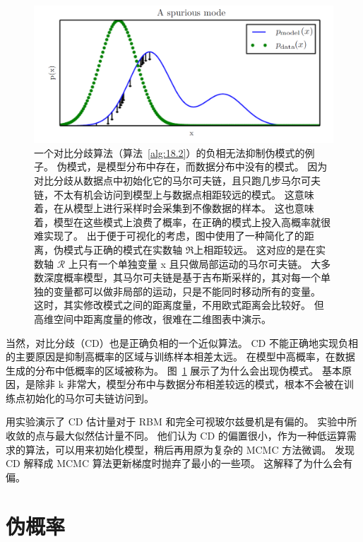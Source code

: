 \begin{figure}[htbp] %
   \centering
   \includegraphics[width=\textwidth]{fig/chap18/18_2.png} 
   \caption{一个对比分歧算法（算法~\ref{alg:18.2}）的负相无法抑制伪模式的例子。
   伪模式，是模型分布中存在，而数据分布中没有的模式。
   因为对比分歧从数据点中初始化它的马尔可夫链，且只跑几步马尔可夫链，不太有机会访问到模型上与数据点相距较远的模式。
   这意味着，在从模型上进行采样时会采集到不像数据的样本。
   这也意味着，模型在这些模式上浪费了概率，在正确的模式上投入高概率就很难实现了。
   出于便于可视化的考虑，图中使用了一种简化了的距离，伪模式与正确的模式在实数轴 \(\mathfrak{R}\)上相距较远。
   这对应的是在实数轴 \(\mathcal{R} \) 上只有一个单独变量 x 且只做局部运动的马尔可夫链。
   大多数深度概率模型，其马尔可夫链是基于吉布斯采样的，其对每一个单独的变量都可以做非局部的运动，只是不能同时移动所有的变量。
   这时，其实修改模式之间的距离度量，不用欧式距离会比较好。
   但高维空间中距离度量的修改，很难在二维图表中演示。}
   \label{fig:18.2}
\end{figure}

当然，对比分歧（CD）也是正确负相的一个近似算法。
CD 不能正确地实现负相的主要原因是抑制高概率的区域与训练样本相差太远。
在模型中高概率，在数据生成的分布中低概率的区域被称为。
图~\ref{fig:18.2} 展示了为什么会出现伪模式。
基本原因，是除非 k 非常大，模型分布中与数据分布相差较远的模式，根本不会被在训练点初始化的马尔可夫链访问到。

 用实验演示了 CD 估计量对于 RBM 和完全可视玻尔兹曼机是有偏的。
实验中所收敛的点与最大似然估计量不同。
他们认为 CD 的偏置很小，作为一种低运算需求的算法，可以用来初始化模型，稍后再用原为复杂的 MCMC 方法微调。
 发现 CD 解释成 MCMC 算法更新梯度时抛弃了最小的一些项。
这解释了为什么会有偏。



\section{伪概率}
\label{sec:18.3}

